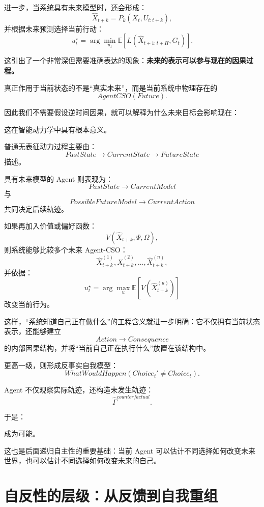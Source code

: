 进一步，当系统具有未来模型时，还会形成：
\[
\hat X_{t+k}
=
P_k(
X_t,
U_{t:t+k}
),
\]
并根据未来预测选择当前行动：
\[
u_t^\star
=
\arg\min_{u_t}
\mathbb E
\left[
L(
\hat X_{t+1:t+H},
G_t
)
\right].
\]

这引出了一个非常深但需要准确表达的现象：\textbf{未来的表示可以参与现在的因果过程。}

真正作用于当前状态的不是“真实未来”，而是当前系统中物理存在的
\[
AgentCSO(Future).
\]

因此我们不需要假设逆时间因果，就可以解释为什么未来目标会影响现在：
\begin{statementbox}
\centering
{}
\end{statementbox}

这在智能动力学中具有根本意义。

普通无表征动力过程主要由：
\[
PastState
\rightarrow
CurrentState
\rightarrow
FutureState
\]
描述。

具有未来模型的 Agent 则表现为：
\[
PastState
\rightarrow
CurrentModel
\]
与
\[
PossibleFutureModel
\rightarrow
CurrentAction
\]
共同决定后续轨迹。

如果再加入价值或偏好函数：
\[
V(\hat X_{t+k},\Psi,\Omega),
\]
则系统能够比较多个未来 Agent-CSO：
\[
\hat X_{t+k}^{(1)},
\hat X_{t+k}^{(2)},
\ldots,
\hat X_{t+k}^{(n)},
\]
并依据：
\[
u_t^\star
=
\arg\max_u
\mathbb E
\left[
V(
\hat X_{t+k}^{(u)}
)
\right]
\]
改变当前行为。

这样，“系统知道自己正在做什么”的工程含义就进一步明确：它不仅拥有当前状态表示，还能够建立
\[
Action\rightarrow Consequence
\]
的内部因果结构，并将“当前自己正在执行什么”放置在该结构中。

更高一级，则形成反事实自我模型：
\[
WhatWouldHappen
\left(
Choice_t'
\neq
Choice_t
\right).
\]

Agent 不仅观察实际轨迹，还构造未发生轨迹：
\[
\hat \Gamma^{counterfactual}.
\]

于是：
\begin{statementbox}
\centering
{}
\end{statementbox}
成为可能。

这也是后面递归自主性的重要基础：当前 Agent 可以估计不同选择如何改变未来世界，也可以估计不同选择如何改变未来的自己。

\section{自反性的层级：从反馈到自我重组}

